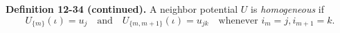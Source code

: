 \textbf{Definition 12-34 (continued).} A neighbor potential $U$ is \textit{homogeneous} if
$$
U_{\{m\}}(\iota) = u_j \quad \text{and} \quad U_{\{m,m+1\}}(\iota) = u_{jk} \quad \text{whenever } i_m = j, i_{m+1} = k.
$$

